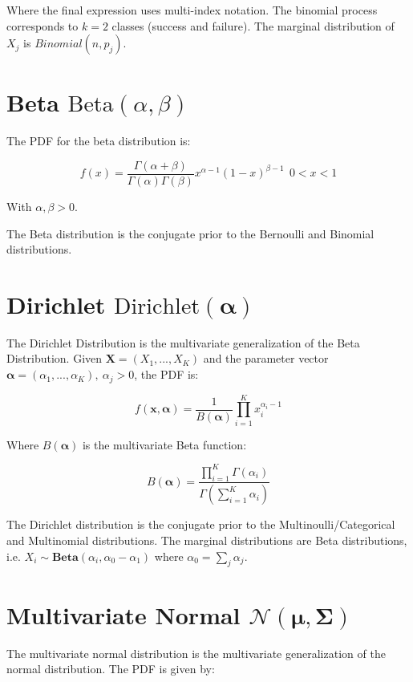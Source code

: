 Where the final expression uses multi-index notation. The binomial process corresponds to $k=2$ classes (success and failure). The marginal distribution of $X_j$ is $Binomial(n,p_j)$.


\section{Beta $\mathrm{Beta}(\alpha,\beta)$}

The PDF for the beta distribution is:

\begin{equation}
f(x) = \frac{\Gamma(\alpha + \beta)}{\Gamma(\alpha)\Gamma(\beta)}x^{\alpha-1}(1-x)^{\beta-1}\ \ 0 < x < 1
\end{equation}

With $\alpha, \beta > 0$.

The Beta distribution is the conjugate prior to the Bernoulli and Binomial distributions.

\section{Dirichlet $\mathrm{Dirichlet}(\mathbf{\alpha})$}
The Dirichlet Distribution is the multivariate generalization of the Beta Distribution. Given $\mathbf{X} = (X_1,...,X_K)$ and the parameter vector $\mathbf{\alpha} = (\alpha_1,...,\alpha_K),\ \alpha_j > 0$, the PDF is:

\begin{equation}
f(\mathbf{x},\mathbf{\alpha}) = \frac{1}{B(\mathbf{\alpha})} \prod^K_{i=1} x_i^{\alpha_i -1}
\end{equation}

Where $B(\mathbf{\alpha})$ is the multivariate Beta function:

\begin{equation}
B(\mathbf{\alpha}) = \frac{\prod^K_{i=1}\Gamma(\alpha_i)}{\Gamma(\sum_{i=1}^K\alpha_i)}
\end{equation}

The Dirichlet distribution is the conjugate prior to the Multinoulli/Categorical and Multinomial distributions. The marginal distributions are Beta distributions, i.e. $X_i \sim \mathbf{Beta}(\alpha_i,\alpha_0-\alpha_1)$ where $\alpha_0 = \sum_j \alpha_j$.



\section{Multivariate Normal $\mathscr{N}(\mathbf{\mu},\mathbf{\Sigma})$}
The multivariate normal distribution is the multivariate generalization of the normal distribution. The PDF is given by:


